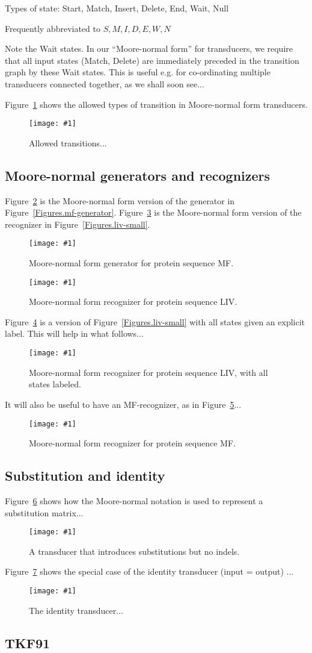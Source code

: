 \documentclass{article}
\newcommand{\figref}[1]{Figure~\ref{Figures.#1}}
\newcommand{\figlabel}[1]{\label{Figures.#1}}
\newcommand{\easyfig}[3]{
\begin{figure}
\texttt{[image: \#1]}
\caption{ \figlabel{#2} #3}
\end{figure}}
\newcommand{\pdffig}[2]{\easyfig{#1.pdf}{#1}{#2}}
\begin{document}
Types of state: Start, Match, Insert, Delete, End, Wait, Null

Frequently abbreviated to $S,M,I,D,E,W,N$

Note the Wait states.
In our ``Moore-normal form'' for transducers, we require that all input states (Match, Delete)
are immediately preceded in the transition graph by these Wait states.
This is useful e.g. for co-ordinating multiple transducers connected together, as we shall soon see...

\figref{transitions} shows the allowed types of transition in Moore-normal form transducers.
\pdffig{transitions}{Allowed transitions...}


\subsection{Moore-normal generators and recognizers}

\figref{moore-mf-generator} is the Moore-normal form version of the generator in \figref{mf-generator}.
\figref{liv} is the Moore-normal form version of the recognizer in \figref{liv-small}.

\pdffig{moore-mf-generator}{Moore-normal form generator for protein sequence MF.}

\pdffig{liv}{Moore-normal form recognizer for protein sequence LIV.}

\figref{liv-labeled} is a version of \figref{liv-small} with all states given an explicit label.
This will help in what follows...

\pdffig{liv-labeled}{Moore-normal form recognizer for protein sequence LIV, with all states labeled.}

It will also be useful to have an MF-recognizer, as in \figref{mf-labeled}...
\pdffig{mf-labeled}{Moore-normal form recognizer for protein sequence MF.}


\subsection{Substitution and identity}

\figref{substituter} shows how the Moore-normal notation is used to represent a substitution matrix...
\pdffig{substituter}{A transducer that introduces substitutions but no indels.}

\figref{identity} shows the special case of the identity transducer (input = output) ...
\pdffig{identity}{The identity transducer...}


\subsection{TKF91}
\end{document}
